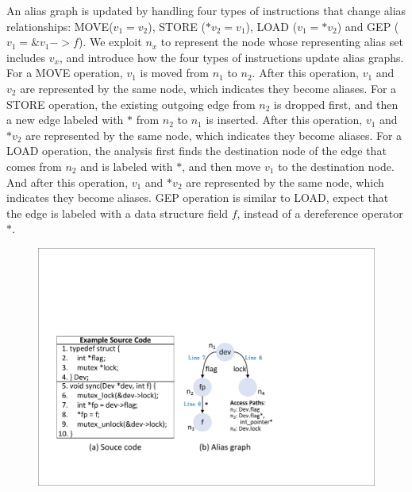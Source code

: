 An alias graph is updated by handling four types of instructions that  
change alias relationships: MOVE($\mathit{v_1 = v_2}$), STORE ($\mathit{*v_2 = 
v_1}$), LOAD ($\mathit{v_1 = *v_2}$) and GEP ({$\mathit{v_1 = \&v_1->f}$}). We 
exploit {$\mathit{n_x}$} to represent the node whose representing alias set 
includes $\mathit{v_x}$, and introduce how the four types of instructions 
update alias graphs. For a MOVE operation, $\mathit{v_1}$ is moved from 
$\mathit{n_1}$ to $\mathit{n_2}$. After this operation, $\mathit{v_1}$ and  
$\mathit{v_2}$ are represented by the same node, which indicates they become 
aliases. For a STORE operation, the existing outgoing edge from $\mathit{n_2}$ 
is dropped first, and then a new edge labeled with $\mathit{*}$ from 
$\mathit{n_2}$ to $\mathit{n_1}$ is inserted. After this operation, 
$\mathit{v_1}$ and $\mathit{*v_2}$ are represented by the same node, which 
indicates they become aliases. For a LOAD operation, the analysis first finds 
the destination node of the edge that comes from $\mathit{n_2}$ and is labeled 
with $\mathit{*}$, and then move $\mathit{v_1}$ to the destination node. And 
after this operation, $\mathit{v_1}$ and $\mathit{*v_2}$ are represented by the 
same node, which indicates they become aliases. GEP operation is similar to 
LOAD, expect that the edge is labeled with a data structure field $\mathit{f}$, 
instead of a dereference operator $\mathit{*}$.

\begin{figure}[htbp]
	\centering
	\includegraphics[width=0.9\linewidth]{figures/fig_alias_graph_demo.pdf}
	\label{fig_alias_graph_demo}
\end{figure}

